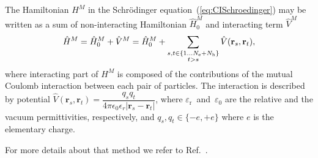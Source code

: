 The Hamiltonian $H^M$ in the Schrödinger equation~(\ref{eq:CISchroedinger}) may be written as a sum of non-interacting Hamiltonian $\hat{H}_0^M$ and interacting term $\hat{V}^M$
%
\begin{equation}
\hat{H} ^M= \hat{H}_0^M + \hat{V}^M = \hat{H} _0^M + \sum_{\substack{s, t \in \{1 \ldots N_{{\rm{e}}}+N_{{\rm{h}}} \}\\t>s} } \hat{V}(\mathbf{r}_s,\mathbf{r}_t), 
\end{equation}
%
where interacting part of $H^M$ is composed of the contributions of the mutual Coulomb interaction between each pair of particles. The interaction is described by potential $\hat{V}(\mathbf{r}_s,\mathbf{r}_t)=\dfrac{q_sq_t}{4\pi \epsilon_0\epsilon_r |\mathbf{r}_s - \mathbf{r}_t|}$, where $\varepsilon_\mathrm{r}$~and~$\varepsilon_0$ are the relative and the vacuum permittivities, respectively, and $q_s,q_t\in\{-e,+e\}$ where $e$ is the elementary charge.

For more details about that method we refer to Ref.~\citep{Klenovsky2017}.


\newpage

\newpage 